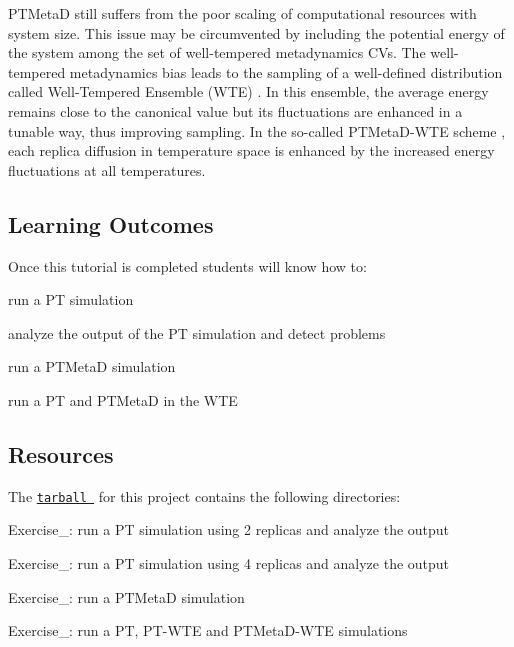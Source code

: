 P\+T\+Meta\+D still suffers from the poor scaling of computational resources with system size. This issue may be circumvented by including the potential energy of the system among the set of well-\/tempered metadynamics C\+Vs. The well-\/tempered metadynamics bias leads to the sampling of a well-\/defined distribution called Well-\/\+Tempered Ensemble (W\+T\+E) \cite{Bonomi:2009p17935}. In this ensemble, the average energy remains close to the canonical value but its fluctuations are enhanced in a tunable way, thus improving sampling. In the so-\/called P\+T\+Meta\+D-\/\+W\+T\+E scheme \cite{ct300297t}, each replica diffusion in temperature space is enhanced by the increased energy fluctuations at all temperatures.\hypertarget{belfast-7_belfast-7-lo}{}\subsection{Learning Outcomes}\label{belfast-7_belfast-7-lo}
Once this tutorial is completed students will know how to\+:


\begin{DoxyItemize}
\item run a P\+T simulation
\item analyze the output of the P\+T simulation and detect problems
\item run a P\+T\+Meta\+D simulation
\item run a P\+T and P\+T\+Meta\+D in the W\+T\+E
\end{DoxyItemize}\hypertarget{belfast-7_belfast-7-resources}{}\subsection{Resources}\label{belfast-7_belfast-7-resources}
The \href{tutorial-resources/belfast-7.tar.gz}{\tt tarball } for this project contains the following directories\+:


\begin{DoxyItemize}
\item Exercise\+\_\+: run a P\+T simulation using 2 replicas and analyze the output
\item Exercise\+\_\+: run a P\+T simulation using 4 replicas and analyze the output
\item Exercise\+\_\+: run a P\+T\+Meta\+D simulation
\item Exercise\+\_\+: run a P\+T, P\+T-\/\+W\+T\+E and P\+T\+Meta\+D-\/\+W\+T\+E simulations
\end{DoxyItemize}

